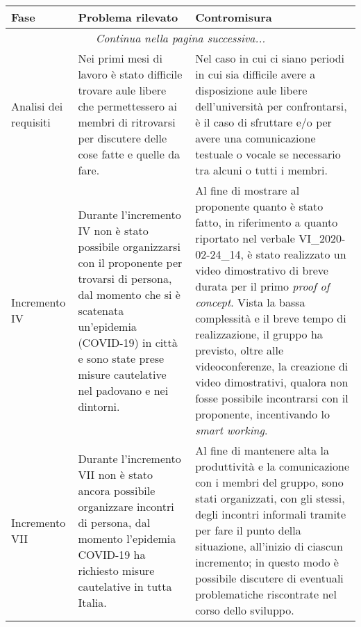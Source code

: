		\begin{center}
			\begin{longtable}{|p{3cm}|p{6cm}|p{6cm}|}
				\hline
				\rowcolor{lighter-grayer}
				\textbf{Fase} & \textbf{Problema rilevato} & \textbf{Contromisura}\\
				\hline
				\endfirsthead
				\hline
		        \multicolumn{3}{|c|}{\textit{Continua nella pagina successiva...}}\\
		        \hline
		        \endfoot
		        \endlastfoot
		        
		        \hline
		        Analisi dei requisiti
		        &
		        Nei primi mesi di lavoro è stato difficile trovare aule libere che permettessero ai membri di ritrovarsi per discutere delle cose fatte e quelle da fare.
		        &
		        Nel caso in cui ci siano periodi in cui sia difficile avere a disposizione aule libere dell'università per confrontarsi, è il caso di sfruttare \glock{Slack} e/o \glock{Discord} per avere una comunicazione testuale o vocale se necessario tra alcuni o tutti i membri. \\
		        \hline
		        
				Incremento IV
				&
				Durante l'incremento IV non è stato possibile organizzarsi con il proponente per trovarsi di persona, dal momento che si è scatenata un'epidemia (COVID-19) in città e sono state prese misure cautelative nel padovano e nei dintorni.
			  	&
		 		Al fine di mostrare al proponente quanto è stato fatto, in riferimento a quanto riportato nel verbale VI\_2020-02-24\_14, è stato realizzato un video dimostrativo di breve durata per il primo \textit{proof of concept}. Vista la bassa complessità e il breve tempo di realizzazione, il gruppo ha previsto, oltre alle videoconferenze, la creazione di video dimostrativi, qualora non fosse possibile incontrarsi con il proponente, incentivando lo \textit{smart working}.  \\
				\hline

				Incremento VII
				&
				Durante l'incremento VII non è stato ancora possibile organizzare incontri di persona, dal momento l'epidemia COVID-19 ha richiesto misure cautelative in tutta Italia.
			  	&
		 		Al fine di mantenere alta la produttività e la comunicazione con i membri del gruppo, sono stati organizzati, con gli stessi, degli incontri informali tramite \glock{Discord} per fare il punto della situazione, all'inizio di ciascun incremento; in questo modo è possibile discutere di eventuali problematiche riscontrate nel corso dello sviluppo.  \\
				\hline
				

\end{longtable}
\end{center}
